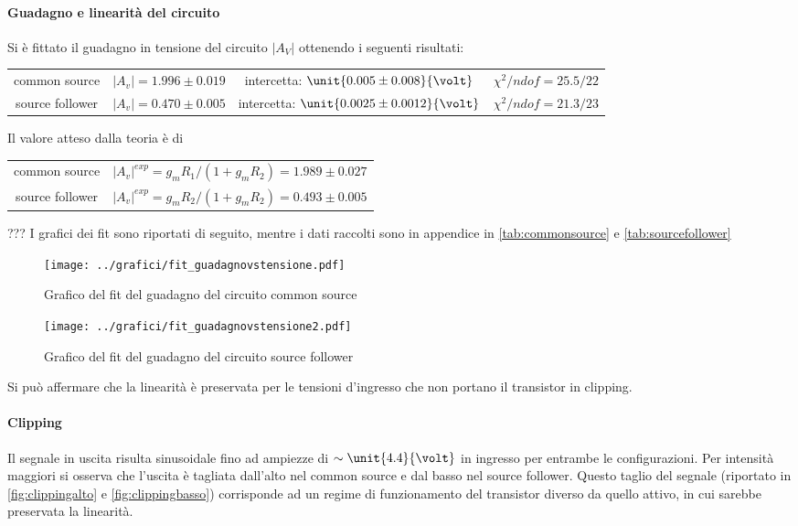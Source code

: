 \documentclass[10pt,a4paper]{article}
\begin{document}
\paragraph{Guadagno e linearità del circuito} Si è fittato il guadagno in tensione del circuito $|A_V|$ ottenendo i seguenti risultati:
\begin{table}[h!]
	\centering
	\begin{tabular}{cccc}
		common source & $|A_v| = 1.996 \pm 0.019$ & intercetta: $\unit{0.005 \pm 0.008}{\volt}$ & $\chi^2 / ndof = 25.5 / 22$\\
		source follower &	$|A_v| = 0.470 \pm 0.005$ & intercetta: $\unit{0.0025 \pm 0.0012}{\volt}$ & $\chi^2 / ndof = 21.3 / 23$
	\end{tabular}
\end{table}

Il valore atteso dalla teoria è di

\begin{table}[h!]
	\centering
	\begin{tabular}{cc}
		common source & $|A_v|^{exp} =g_mR_1/(1+g_mR_2) = 1.989 \pm 0.027$ \\
		source follower &	$|A_v|^{exp} =g_mR_2/(1+g_mR_2) = 0.493 \pm 0.005
		 $
	\end{tabular}
\end{table}

???
I grafici dei fit sono riportati di seguito, mentre i dati raccolti sono in appendice in \tablename{\ref{tab:commonsource}} e \tablename{\ref{tab:sourcefollower}}

\begin{figure}[h!]
	\centering
	\texttt{[image: ../grafici/fit\_guadagnovstensione.pdf]}
	\caption{Grafico del fit del guadagno del circuito common source}
\end{figure}
\begin{figure}[h!]
	\centering
	\texttt{[image: ../grafici/fit\_guadagnovstensione2.pdf]}
	\caption{Grafico del fit del guadagno del circuito source follower}
\end{figure}

 Si può affermare che la linearità è preservata per le tensioni d'ingresso che non portano il transistor in clipping.
  
 \paragraph{Clipping}
Il segnale in uscita risulta sinusoidale fino ad ampiezze di $\sim \unit{4.4}{\volt}$ in ingresso per entrambe le configurazioni.
Per intensità maggiori si osserva che l'uscita è tagliata dall'alto nel common source e dal basso nel source follower. Questo taglio del segnale (riportato in \figurename{\ref{fig:clippingalto}} e \figurename{\ref{fig:clippingbasso}}) corrisponde ad un regime di funzionamento del transistor diverso da quello attivo, in cui sarebbe preservata la linearità.
\end{document}
